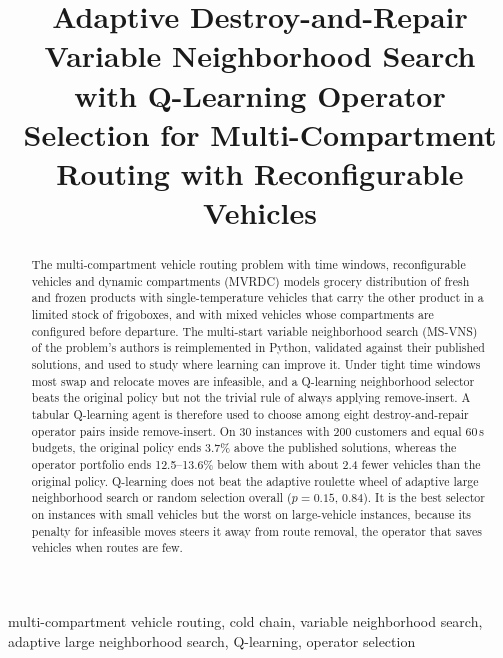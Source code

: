 \documentclass[conference]{IEEEtran}
\begin{document}
\title{Adaptive Destroy-and-Repair Variable Neighborhood Search with Q-Learning Operator Selection for Multi-Compartment Routing with Reconfigurable Vehicles}

\author{
}

\maketitle

\begin{abstract}
The multi-compartment vehicle routing problem with time windows, reconfigurable vehicles and dynamic compartments (MVRDC) models grocery distribution of fresh and frozen products with single-temperature vehicles that carry the other product in a limited stock of frigoboxes, and with mixed vehicles whose compartments are configured before departure. The multi-start variable neighborhood search (MS-VNS) of the problem's authors is reimplemented in Python, validated against their published solutions, and used to study where learning can improve it. Under tight time windows most swap and relocate moves are infeasible, and a Q-learning neighborhood selector beats the original policy but not the trivial rule of always applying remove-insert. A tabular Q-learning agent is therefore used to choose among eight destroy-and-repair operator pairs inside remove-insert. On 30 instances with 200 customers and equal 60\,s budgets, the original policy ends 3.7\% above the published solutions, whereas the operator portfolio ends 12.5--13.6\% below them with about 2.4 fewer vehicles than the original policy. Q-learning does not beat the adaptive roulette wheel of adaptive large neighborhood search or random selection overall ($p=0.15$, $0.84$). It is the best selector on instances with small vehicles but the worst on large-vehicle instances, because its penalty for infeasible moves steers it away from route removal, the operator that saves vehicles when routes are few.
\end{abstract}

\begin{IEEEkeywords}
multi-compartment vehicle routing, cold chain, variable neighborhood search, adaptive large neighborhood search, Q-learning, operator selection
\end{IEEEkeywords}
\end{document}
